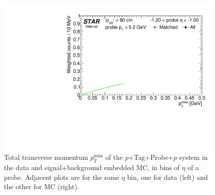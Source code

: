 %
%
%
%
\begin{figure}[h!]
\caption[Tag\&Probe fits to $p_{T}^{\text{miss}}$ in bins of probe $\eta$.]{Total transverse momentum $p_{T}^{\text{miss}}$ of the $p$+Tag+Probe+$p$ system in the data and signal+background embedded MC, in bins of $\eta$ of a probe. Adjacent plots are for the same $\eta$ bin, one for data (left) and the other for MC (right).}\label{fig:tagAndProbeTofEffFits_Eta}
\centering
\parbox{0.24\textwidth}{ 
  \centering
  \includegraphics[width=\linewidth,page=3]{graphics/correctionsToEff/TOF_tagAndProbe/Fitting_effVsEta_data.CPT2.pdf}%

}
\end{figure}
